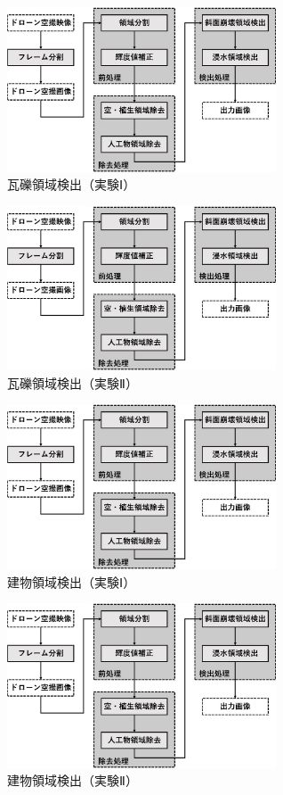 \documentclass[../Thesis]{subfiles}
\begin{document}
\begin{figure}[h]
	\centering
	\includegraphics[width=8cm]{img/howto3.jpg}
	\caption{瓦礫領域検出（実験Ⅰ）}
	\label{img05}
\end{figure}
\begin{figure}[h]
	\centering
	\includegraphics[width=8cm]{img/howto3.jpg}
	\caption{瓦礫領域検出（実験Ⅱ）}
	\label{img06}
\end{figure}

\begin{figure}[h]
	\centering
	\includegraphics[width=8cm]{img/howto3.jpg}
	\caption{建物領域検出（実験Ⅰ）}
	\label{img05}
\end{figure}
\begin{figure}[h]
	\centering
	\includegraphics[width=8cm]{img/howto3.jpg}
	\caption{建物領域検出（実験Ⅱ）}
	\label{img06}
\end{figure}
\end{document}
